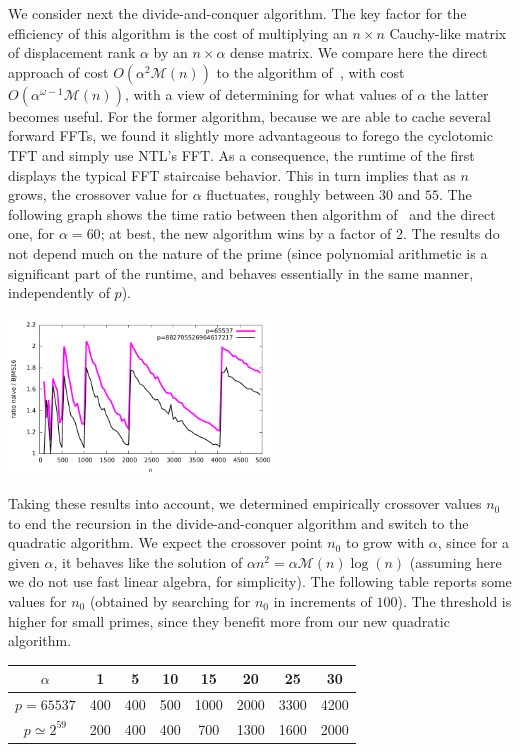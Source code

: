 \documentclass{sig-alternate}
\newcommand{\M}{\ensuremath{\mathscr{M}}}
\begin{document}
We consider next the divide-and-conquer algorithm. The key factor for
the efficiency of this algorithm is the cost of multiplying an $n
\times n$ Cauchy-like matrix of displacement rank $\alpha$ by an $n
\times \alpha$ dense matrix. We compare here the direct approach of
cost $O(\alpha^2 \M(n))$ to the algorithm of~\cite{BoJeMoSc16}, with
cost $O(\alpha^{\omega-1} \M(n))$, with a view of determining for what
values of $\alpha$ the latter becomes useful. For the former
algorithm, because we are able to cache several forward FFTs, we found
it slightly more advantageous to forego the cyclotomic TFT and simply
use NTL's FFT. As a consequence, the runtime of the first displays the
typical FFT staircaise behavior. This in turn implies that as $n$
grows, the crossover value for $\alpha$ fluctuates, roughly between
$30$ and $55$. The following graph shows the time ratio between then algorithm
of~\cite{BoJeMoSc16} and the direct one, for $\alpha=60$; at
best, the new algorithm wins by a factor of 2. The results do not
depend much on the nature of the prime (since polynomial arithmetic is
a significant part of the runtime, and behaves essentially in the same
manner, independently of $p$).

\includegraphics[width=7cm]{ratio-mul-matrix-eschost-desktop.pdf}

Taking these results into account, we determined empirically crossover
values $n_0$ to end the recursion in the divide-and-conquer algorithm
and switch to the quadratic algorithm. We expect the crossover point
$n_0$ to grow with $\alpha$, since for a given $\alpha$, it behaves
like the solution of $\alpha n^2 = \alpha \M(n) \log(n)$ (assuming
here we do not use fast linear algebra, for simplicity). The following
table reports some values for $n_0$ (obtained by searching for $n_0$
in increments of $100$).  The threshold is higher for small primes,
since they benefit more from our new quadratic algorithm.

\begin{center}
{\small
\begin{tabular}{|c||c|c|c|c|c|c|c|}\hline
  $\alpha$ & 1 & 5 & 10 & 15 & 20 & 25 &30 \\\hline\hline
$p=65537$  & 400 &400 &500  &1000  &2000  &3300  &4200 \\\hline
$p\simeq 2^{59}$  & 200 & 400 & 400 & 700 & 1300 & 1600 & 2000\\\hline
\end{tabular}
}
\end{center}
\end{document}
